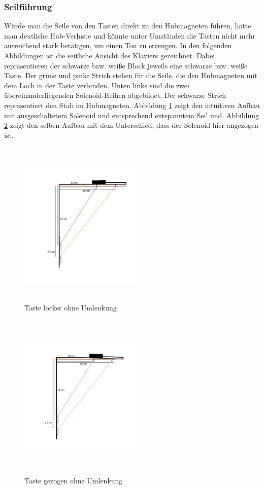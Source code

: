 \subsubsection{Seilführung}

Würde man die Seile von den Tasten direkt zu den Hubmagneten führen,
hätte man deutliche Hub-Verluste und könnte unter Umständen die Tasten nicht mehr ausreichend stark betätigen, um einen Ton zu erzeugen.
\newline
In den folgenden Abbildungen ist die seitliche Ansicht des Klaviers gezeichnet.
Dabei repräsentieren der schwarze bzw. weiße Block jeweils eine schwarze bzw. weiße Taste.
Der grüne und pinke Strich stehen für die Seile, die den Hubmagneten mit dem Loch in der Taste verbinden.
Unten links sind die zwei übereinanderliegenden Solenoid-Reihen abgebildet.
Der schwarze Strich repräsentiert den Stab im Hubmagneten.
\newline
Abbildung \ref{img:kUmlenkung_locker} zeigt den intuitiven Aufbau mit ausgeschaltetem Solenoid und entsprechend entspanntem Seil und.
Abbildung \ref{img:kUmlenkung_gezogen} zeigt den selben Aufbau mit dem Unterschied, dass der Solenoid hier angezogen ist.

\begin{figure}[htbp]
    \centering
    \includegraphics[width=6cm, height=8cm]{img/Umlenkung_locker}
    \caption{Taste locker ohne Umlenkung}
    \label{img:kUmlenkung_locker}
\end{figure}

\begin{figure}[htbp]
    \centering
    \includegraphics[width=6cm, height=8cm]{img/Umlenkung_gezogen}
    \caption{Taste gezogen ohne Umlenkung}
    \label{img:kUmlenkung_gezogen}
\end{figure}

